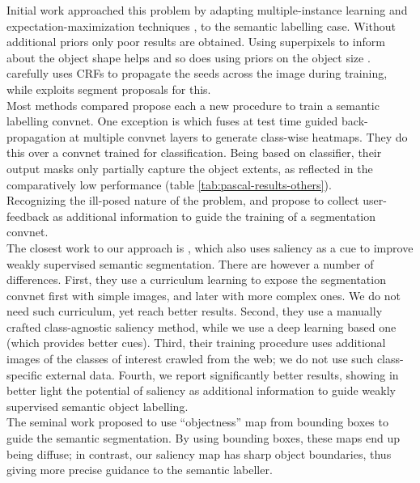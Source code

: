 \documentclass[british,10pt,twocolumn,letterpaper]{article}
\begin{document}
Initial work approached this problem by adapting multiple-instance
learning \cite{Pathak2015Iclrw} and expectation-maximization techniques
\cite{Papandreou2015Iccv}, to the semantic labelling case. Without
additional priors only poor results are obtained. Using superpixels
to inform about the object shape helps \cite{Pinheiro2015Cvpr,Xu2015CvprWeakSegmentation}
and so does using priors on the object size \cite{Pathak2015Iccv}.
\cite{kolesnikov2016seed} carefully uses CRFs to propagate the seeds
across the image during training, while \cite{Qi2016Eccv} exploits
segment proposals for this.\\
Most methods compared propose each a new procedure to train a semantic
labelling convnet. One exception is \cite{Shimoda2016Eccv} which
fuses at test time guided back-propagation \cite{Springenberg2015Iclrw}
at multiple convnet layers to generate class-wise heatmaps. They do
this over a convnet trained for classification. Being based on classifier,
their output masks only partially capture the object extents, as reflected
in the comparatively low performance (table \ref{tab:pascal-results-others}).\\
Recognizing the ill-posed nature of the problem, \cite{Kolesnikov2016Bmvc}
and \cite{Saleh2016Eccv} propose to collect user-feedback as additional
information to guide the training of a segmentation convnet.\\
The closest work to our approach is \cite{Wei2015ArXiv}, which also
uses saliency as a cue to improve weakly supervised semantic segmentation.
There are however a number of differences. First, they use a curriculum
learning to expose the segmentation convnet first with simple images,
and later with more complex ones. We do not need such curriculum,
yet reach better results. Second, they use a manually crafted class-agnostic
saliency method, while we use a deep learning based one (which provides
better cues). Third, their training procedure uses 
additional images of the classes of interest crawled from the web;
we do not use such class-specific external data. Fourth, we report
significantly better results, showing in better light the potential
of saliency as additional information to guide weakly supervised semantic
object labelling. \\
The seminal work \cite{Vezhnevets2011Iccv} proposed to use
``objectness'' map from bounding boxes to guide the semantic
segmentation. By using bounding boxes, these maps end up being
diffuse; in contrast, our saliency map has sharp object
boundaries, thus giving more precise guidance to the semantic
labeller. 
\end{document}

